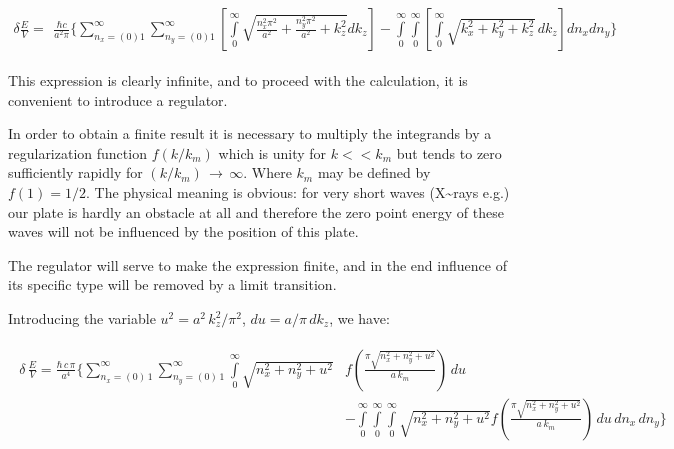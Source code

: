 \documentclass[twoside, 10pt]{article}
\begin{document}
    \begin{equation} \label{eq:1}
\begin{array}{lr}
\delta \frac{E}{V} =
\begin{array}{c}
\frac{\hbar c}{a^2 \pi}\Bigg\{\sum\limits_{n_x=(0)1}^{\infty}\sum\limits_{n_y=(0)1}^{\infty}\left[\int\limits_{0}^{\infty}\sqrt{\frac{n_x^2 \pi^2}{a^2}+\frac{n_y^2 \pi^2}{a^2}+k_z^2} dk_z\right] %
-\int\limits_{0}^{\infty}\int\limits_{0}^{\infty}\left[\int\limits_{0}^{\infty}\sqrt{k_x^2+k_y^2+k_z^2}\,dk_z\right] dn_x dn_y\Bigg\}
\end{array}\end{array}\end{equation}

\begin{multicols}{2}

    This expression is clearly infinite, and to proceed with the
calculation, it is convenient to introduce a regulator.

    In order to obtain a finite result it is necessary to multiply the
integrands by a regularization function \(f(k/k_m)\) which is unity for
\(k << k_m\) but tends to zero sufficiently rapidly for
\((k/k_m)\, \rightarrow\,\infty\). Where \(k_m\) may be defined by
\(f(1) = {1}/{2}\). The physical meaning is obvious: for very short
waves (X\textasciitilde{}rays e.g.) our plate is hardly an obstacle at
all and therefore the zero point energy of these waves will not be
influenced by the position of this plate.

    The regulator will serve to make the expression finite, and in the end
influence of its specific type will be removed by a limit transition.

    Introducing the variable \(u^2 = a^2\,k_z^2/\pi^2\),
\(du = a/\pi\,dk_z\), we have:

\end{multicols}

    \begin{equation}
\begin{array}{c}
\begin{array}{ll}
\delta\,\frac{E}{V} =
\frac{\hbar\,c\,\pi}{a^4}\Bigg\{
\sum\limits_{n_x=\left(0\right)\,1}^{\infty}
\sum\limits_{n_y=\left(0\right)\,1}^{\infty}
\int\limits_{0}^{\infty}
{\sqrt{n_x^2 + n_y^2 + u^2}} &
f\left(\frac{\pi\sqrt{n_x^2 + n_y^2 + u^2}}{a\,k_m}\right)
\,d{u} \\
\, &- \int\limits_{0}^{\infty}
\int\limits_{0}^{\infty}
\int\limits_{0}^{\infty}
{\sqrt{n_x^2 + n_y^2 + u^2}}
f\left(\frac{\pi\sqrt{n_x^2 + n_y^2 + u^2}}{a\,k_m}\right)
\,d{u}\,d{n_x}\,d{n_y}
\Bigg\}
\end{array}
\end{array}
\end{equation}
\end{document}
